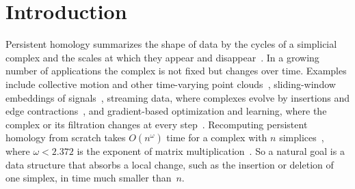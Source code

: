 \section{Introduction}\label{sec:intro}

Persistent homology summarizes the shape of data by the cycles of a simplicial complex and the scales at which they appear and disappear~\cite{ELZ02,ZC05,EH10}.
In a growing number of applications the complex is not fixed but changes over time.
Examples include collective motion and other time-varying point clouds~\cite{TZH15,KM21}, sliding-window embeddings of signals~\cite{PH15}, streaming data, where complexes evolve by insertions and edge contractions~\cite{KS19}, and gradient-based optimization and learning, where the complex or its filtration changes at every step~\cite{HKND19,CCGIKU21}.
Recomputing persistent homology from scratch takes $O(n^{\omega})$ time for a complex with $n$ simplices~\cite{MMS11}, where $\omega<2.372$ is the exponent of matrix multiplication~\cite{ADVXXZ25}.
So a natural goal is a data structure that absorbs a local change, such as the insertion or deletion of one simplex, in time much smaller than~$n$.

